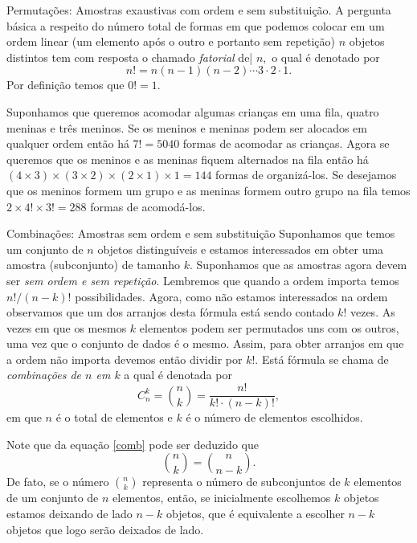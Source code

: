 \begin{frame}{Permutações: Amostras exaustivas com ordem e sem substituição.} A pergunta básica a respeito do número total de formas em que podemos colocar em um ordem linear (um  elemento após o outro e portanto sem repetição) $n$ objetos distintos tem com resposta o chamado {\it fatorial} de| $n,$ o qual é denotado por $$n! = n(n-1)(n-2)\cdots 3\cdot 2 \cdot 1.$$ Por definição temos que $0!=1.$

\begin{exem}
Suponhamos que queremos acomodar algumas crianças em uma fila, quatro meninas e três meninos. Se os meninos e meninas podem ser alocados em qualquer ordem então há $7!=5040$ formas de acomodar as crianças. Agora se queremos que os meninos e as meninas fiquem alternados na fila então há 
$(4\times 3) \times (3\times 2) \times (2\times 1) \times 1 = 144$ formas de organizá-los. Se desejamos que os meninos formem um grupo e as meninas formem outro grupo na fila temos $2\times 4! \times 3! =288$ formas de acomodá-los. 
\end{exem}

\end{frame}


\begin{frame}{Combinações: Amostras sem ordem e sem substituição} Suponhamos  que temos um conjunto de $n$ objetos distinguíveis e estamos interessados em obter uma amostra (subconjunto)  de tamanho $k.$ Suponhamos que as amostras agora devem ser {\it sem ordem e sem repetição}.  Lembremos que quando a ordem importa temos ${n!}/{(n-k)!}$ possibilidades. Agora, como não estamos interessados na ordem observamos que um dos arranjos desta fórmula está sendo contado $k!$ vezes. As vezes em que os mesmos $k$ elementos podem ser permutados uns com os outros, uma vez que o conjunto de dados é o mesmo. Assim, para obter arranjos em que a ordem não importa devemos então dividir por $k!.$ Está fórmula se chama de {\it combinações de $n$ em $k$} a qual é denotada por 
\begin{equation}
\label{comb}
C_n^k = {n\choose k} = \frac{n!}{k!\cdot\left(n - k\right)!}, 
\end{equation}
em que  $n$ é o total de elementos e $k$ é o número de elementos escolhidos. 

Note que da equação \ref{comb} pode ser deduzido que 
\begin{equation}
\label{comb2}
{n \choose k} = {n \choose n-k} .
\end{equation}
De fato, se o número $\displaystyle{{n \choose k}}$ representa o número de subconjuntos de $k$ elementos
de um conjunto de $n$ elementos, então, se inicialmente escolhemos $k$ objetos estamos deixando de lado $n-k$ objetos, que é equivalente a escolher $n-k$ objetos que logo serão deixados de lado.

\end{frame}

